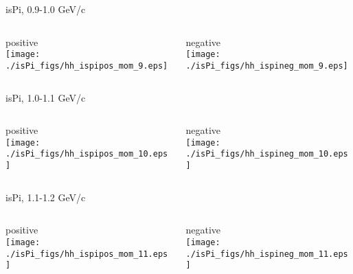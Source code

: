 \documentclass[compress]{beamer} %
\begin{document}

\begin{frame}{isPi, 0.9-1.0 GeV/c}
\begin{columns}
\begin{column}{.5\linewidth}
positive \\
\texttt{[image: ./isPi\_figs/hh\_ispipos\_mom\_9.eps]} \\
\end{column}
\begin{column}{.5\linewidth}
negative \\
\texttt{[image: ./isPi\_figs/hh\_ispineg\_mom\_9.eps]} \\
\end{column}
\end{columns}
\end{frame}


\begin{frame}{isPi, 1.0-1.1 GeV/c}
\begin{columns}
\begin{column}{.5\linewidth}
positive \\
\texttt{[image: ./isPi\_figs/hh\_ispipos\_mom\_10.eps]} \\
\end{column}
\begin{column}{.5\linewidth}
negative \\
\texttt{[image: ./isPi\_figs/hh\_ispineg\_mom\_10.eps]} \\
\end{column}
\end{columns}
\end{frame}


\begin{frame}{isPi, 1.1-1.2 GeV/c}
\begin{columns}
\begin{column}{.5\linewidth}
positive \\
\texttt{[image: ./isPi\_figs/hh\_ispipos\_mom\_11.eps]} \\
\end{column}
\begin{column}{.5\linewidth}
negative \\
\texttt{[image: ./isPi\_figs/hh\_ispineg\_mom\_11.eps]} \\
\end{column}
\end{columns}
\end{frame}
\end{document}
